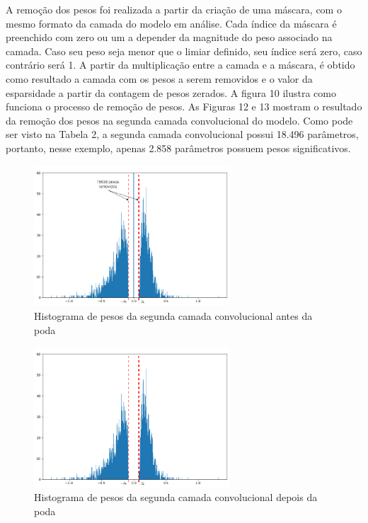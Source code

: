 A remoção dos pesos foi realizada a partir da criação de uma máscara, com o mesmo formato da camada do modelo em análise. Cada índice da máscara é preenchido com zero ou um a depender da magnitude do peso associado na camada. Caso seu peso seja menor que o limiar definido, seu índice será zero, caso contrário será 1. A partir da multiplicação entre a camada e a máscara, é obtido como resultado a camada com os pesos a serem removidos e o valor da esparsidade a partir da contagem de pesos zerados. A figura 10 ilustra como funciona o processo de remoção de pesos. As Figuras 12 e 13 mostram o resultado da remoção dos pesos na segunda camada convolucional do modelo. Como pode ser visto na Tabela 2, a segunda camada convolucional possui 18.496 parâmetros, portanto, nesse exemplo, apenas 2.858 parâmetros possuem pesos significativos.




\begin{figure}[H]
	\includegraphics[width=0.65\textwidth, keepaspectratio=true]{figuras/antes (1).png}
	\centering
	\caption[Histograma de pesos da segunda camada convolucional antes da poda]{Histograma de pesos da segunda camada convolucional antes da poda}
\end{figure}

\begin{figure}[H]
	\includegraphics[width=0.65\textwidth, keepaspectratio=true]{figuras/depois.png}
	\centering
	\caption[Histograma de pesos da segunda camada convolucional depois da poda]{Histograma de pesos da segunda camada convolucional depois da poda}
\end{figure}


